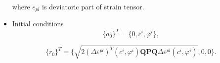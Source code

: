 \begin{itemize}
	where $e_{pl}$ is deviatoric part of strain tensor. 
		
	\item Initial conditions
	\begin{equation}
		\lbrace a_0 \rbrace^T = \lbrace 0, c^i, \varphi^i\rbrace,
	\end{equation}
	
	\begin{equation}
		\lbrace r_0 \rbrace^T = \lbrace \sqrt{2(\Delta \varepsilon^{pl})^T(c^i, \varphi^i) \textbf{QPQ}\Delta\varepsilon^{pl}(c^i, \varphi^i)}, 0, 0\rbrace.
	\end{equation}
\end{itemize}
 

